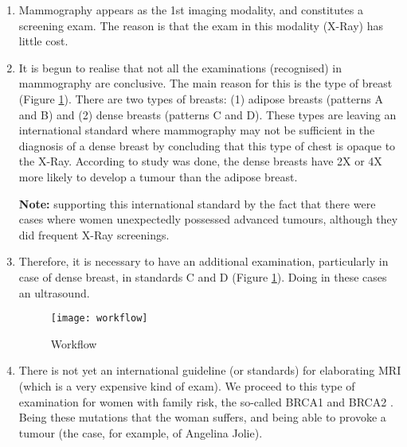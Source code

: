 \begin{enumerate}

\item Mammography appears as the 1st imaging modality, and constitutes a screening exam. The reason is that the exam in this modality (X-Ray) has little cost.

\item It is begun to realise that not all the examinations (recognised) in mammography are conclusive. The main reason for this is the type of breast (Figure \ref{fig:workflow}). There are two types \cite{nothacker2009early, rhodes2011dedicated} of breasts: (1) adipose breasts (patterns A and B) and (2) dense breasts (patterns C and D). These types are leaving an international standard where mammography may not be sufficient in the diagnosis of a dense breast by concluding that this type of chest is opaque to the X-Ray. According to study was done, the dense breasts have 2X or 4X more likely to develop a tumour than the adipose breast.

\hfill

\textbf{Note:} supporting this international standard by the fact that there were cases where women unexpectedly possessed advanced tumours, although they did frequent X-Ray screenings.

\hfill

\item Therefore, it is necessary to have an additional examination, particularly in case of dense breast, in standards C and D (Figure \ref{fig:workflow}). Doing in these cases an ultrasound.


\hfill

\begin{figure}[h]
\centering
\texttt{[image: workflow]}
\caption{Workflow \cite{workflow}}
\label{fig:workflow}
\end{figure}

\hfill


\item There is not yet an international guideline (or standards) for elaborating MRI (which is a very expensive kind of exam). We proceed to this type of examination for women with family risk, the so-called BRCA1 and BRCA2 \cite{chen2007meta}. Being these mutations that the woman suffers, and being able to provoke a tumour (the case, for example, of Angelina Jolie).


\end{enumerate}
